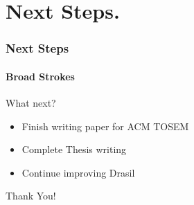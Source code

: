 \documentclass{beamer}
\begin{document}
\section[Next Steps]{Next Steps.}


\begin{frame}

\frametitle{Next Steps}
\framesubtitle{Broad Strokes}


\begin{Large}
What next?
\end{Large}

\begin{itemize}
\item Finish writing paper for ACM TOSEM
\item Complete Thesis writing
\item Continue improving Drasil
\end{itemize}
\end{frame}


\begin{frame}
\begin{center}
\Huge Thank You!
\end{center}
\end{frame}

\end{document}
